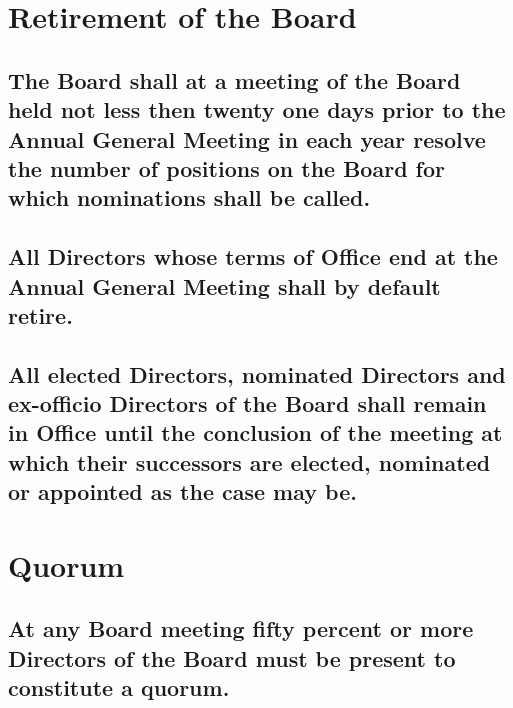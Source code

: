 \documentclass{article}
\newenvironment{subs}
  {\adjustwidth{2em}{0pt}}
  {\endadjustwidth}
\begin{document}
\section{Retirement of the Board}
\begin{subs}
\subsection{The Board shall at a meeting of the Board held not less then twenty one days prior to the Annual General Meeting in each year resolve the number of positions on the Board for which nominations shall be called.}
\subsection{All Directors whose terms of Office end at the Annual General Meeting shall by default retire.}
\subsection{All elected Directors, nominated Directors and ex-officio Directors of the Board shall remain in Office until the conclusion of the meeting at which their successors are elected, nominated or appointed as the case may be.}
\end{subs}

\section{Quorum}
\begin{subs}
\begin{subs}
\subsection{At any Board meeting fifty percent or more Directors of the Board must be present to constitute a quorum.}

\end{subs}
\end{subs}
\end{document}

